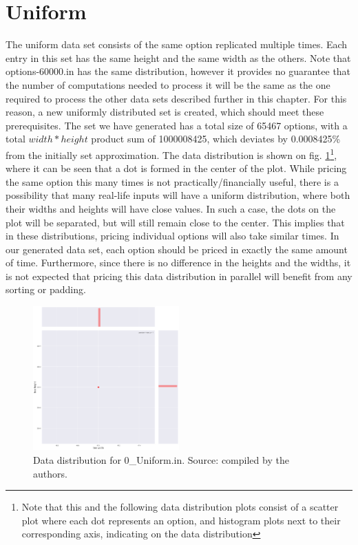 \section{Uniform}
The uniform data set consists of the same option replicated multiple times. Each entry in this set has the same height and the same width as the others. Note that options-60000.in has the same distribution, however it provides no guarantee that the number of computations needed to process it will be the same as the one required to process the other data sets described further in this chapter. For this reason, a new uniformly distributed set is created, which should meet these prerequisites. The set we have generated has a total size of 65467 options, with a total $width*height$ product sum of 1000008425, which deviates by 0.0008425\% from the initially set approximation. The data distribution is shown on fig. \ref{fig:data:uniform}\footnote{Note that this and the following data distribution plots consist of a scatter plot where each dot represents an option, and histogram plots next to their corresponding axis, indicating on the data distribution}, where it can be seen that a dot is formed in the center of the plot. While pricing the same option this many times is not practically/financially useful, there is a possibility that many real-life inputs will have a uniform distribution, where both their widths and heights will have close values. In such a case, the dots on the plot will be separated, but will still remain close to the center. This implies that in these distributions, pricing individual options will also take similar times. In our generated data set, each option should be priced in exactly the same amount of time. Furthermore, since there is no difference in the heights and the widths, it is not expected that pricing this data distribution in parallel will benefit from any sorting or padding.   
 
 \begin{figure}[H]
	\centering
	\includegraphics[width=0.5\textwidth]{img/0_UNIFORM_plot.png}
	\caption{Data distribution for 0\_Uniform.in. Source: compiled by the authors.}
	\label{fig:data:uniform}
\end{figure}

